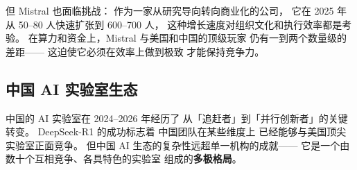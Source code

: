 但 Mistral 也面临挑战：
作为一家从研究导向转向商业化的公司，
它在 2025 年从 50--80 人快速扩张到 600--700 人，
这种增长速度对组织文化和执行效率都是考验。
在算力和资金上，Mistral 与美国和中国的顶级玩家
仍有一到两个数量级的差距——
这迫使它必须在效率上做到极致
才能保持竞争力。

\subsection{中国 AI 实验室生态}
\label{sec:chinese-labs}

中国的 AI 实验室在 2024--2026 年经历了
从「追赶者」到「并行创新者」的关键转变。
DeepSeek-R1 的成功标志着
中国团队在某些维度上
已经能够与美国顶尖实验室正面竞争。
但中国 AI 生态的复杂性远超单一机构的成就——
它是一个由数十个互相竞争、各具特色的实验室
组成的\textbf{多极格局}。

